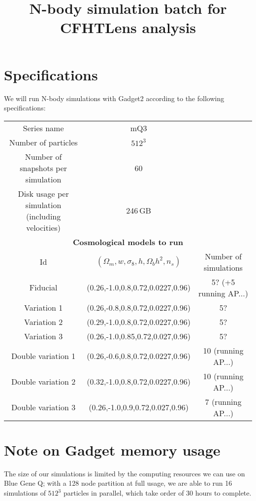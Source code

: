 \documentclass[11pt]{article}
\begin{document}
\title{N-body simulation batch for CFHTLens analysis}
\author{}
\date{}

\maketitle

\section*{Specifications}

We will run N-body simulations with Gadget2 according to the following specifications:

\begin{table}[h!]
\begin{center}
\begin{tabular}{ccc} \hline
Series name & mQ3 & \\
Number of particles & $512^3$ & \\ 
Number of snapshots per simulation & 60 & \\
Disk usage per simulation (including velocities) & 246\,GB& \\ \hline
\multicolumn{3}{c}{\textbf{Cosmological models to run}} \\
Id & $(\Omega_m,w,\sigma_8,h,\Omega_bh^2,n_s)$ & Number of simulations\\ \hline
Fiducial & (0.26,-1.0,0.8,0.72,0.0227,0.96) & 5? (+5 running AP...) \\
Variation 1 & (0.26,-0.8,0.8,0.72,0.0227,0.96) & 5? \\
Variation 2 & (0.29,-1.0,0.8,0.72,0.0227,0.96) & 5? \\
Variation 3 & (0.26,-1.0,0.85,0.72,0.027,0.96) & 5? \\ \hline
Double variation 1 & (0.26,-0.6,0.8,0.72,0.0227,0.96) & 10 (running AP...) \\
Double variation 2 & (0.32,-1.0,0.8,0.72,0.0227,0.96) & 10 (running AP...) \\
Double variation 3 & (0.26,-1.0,0.9,0.72,0.027,0.96) & 7 (running AP...) \\ \hline
\end{tabular}
\end{center}
\end{table}

\section*{Note on Gadget memory usage}
The size of our simulations is limited by the computing resources we can use on Blue Gene Q; with a 128 node partition at full usage, we are able to run 16 simulations of $512^3$ particles in parallel, which take order of 30 hours to complete. 
\end{document}
